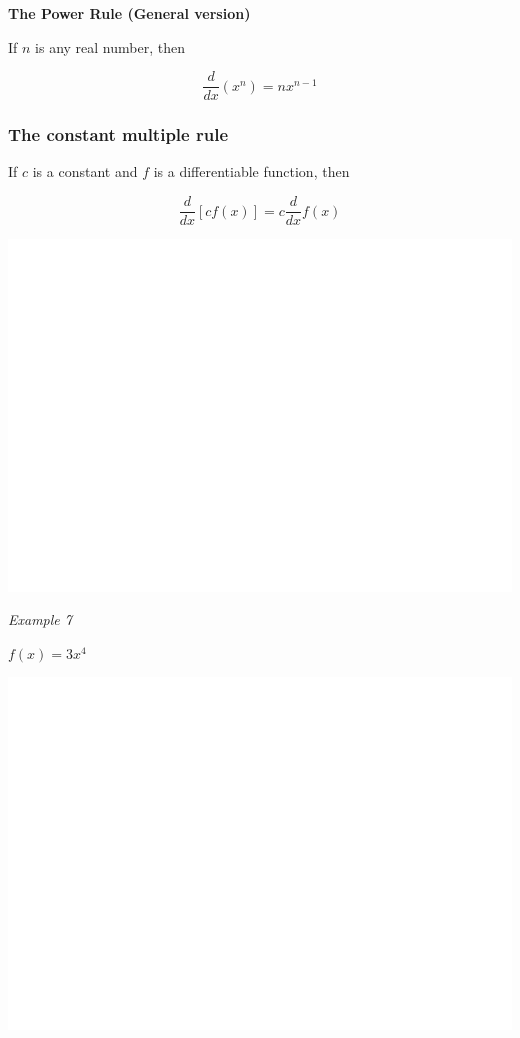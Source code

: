 \documentclass[]{book}
\begin{document}
\textbf{The Power Rule (General version)}

If \(n\) is any real number, then

\[\frac{d}{dx}(x^n)=nx^{n-1}\]

\hypertarget{the-constant-multiple-rule}{%
\subsubsection{The constant multiple rule}\label{the-constant-multiple-rule}}

If \(c\) is a constant and \(f\) is a differentiable function, then

\[\frac{d}{dx}[cf(x)]= c\frac{d}{dx}f(x)\]

\newpage

\begin{center}\includegraphics[width=1\linewidth]{figure/LB10-1} \end{center}

\emph{Example 7}

\(f(x)=3x^4\)

\begin{center}\includegraphics[width=1\linewidth]{figure/LB11-1} \end{center}
\end{document}
